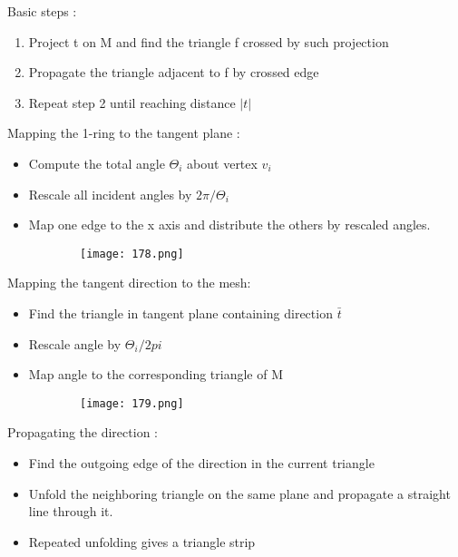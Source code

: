 \documentclass{article}
\begin{document}
Basic steps :

\begin{enumerate}
    \item Project t on M and find the triangle f crossed by such projection
    \item Propagate the triangle adjacent to f by crossed edge
    \item Repeat step 2 until reaching distance $|t| $
\end{enumerate}

Mapping the 1-ring to the tangent plane : 

\begin{itemize}
    \item Compute the total angle $\Theta_i$ about vertex $v_i$
    \item Rescale all incident angles by $2\pi/\Theta_i$
    \item Map one edge to the x axis and distribute the others by rescaled angles.
\end{itemize}

   \begin{figure}[ht!]
  \centering
  \begin{subfigure}[b]{0.2\linewidth}
    \texttt{[image: 178.png]}
  \end{subfigure}
\end{figure}


\vspace{80mm}

Mapping the tangent direction to the mesh:



\begin{itemize}
    \item Find the triangle in tangent plane containing direction $\bar t$
    \item Rescale  angle by $\Theta_i/2pi$
    \item Map angle to the corresponding triangle of M
\end{itemize}

   \begin{figure}[ht!]
  \centering
  \begin{subfigure}[b]{0.2\linewidth}
    \texttt{[image: 179.png]}
  \end{subfigure}
\end{figure}



Propagating the direction :

\begin{itemize}
    \item Find the outgoing edge of the direction in the current triangle
    \item Unfold the neighboring triangle on the same plane and propagate a straight line through it.
    \item Repeated unfolding gives a triangle strip
\end{itemize}
\end{document}
